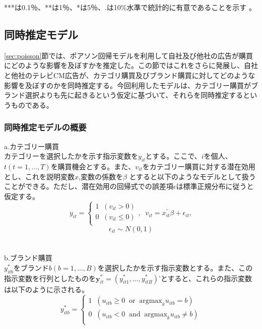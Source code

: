 \documentclass[11pt]{jsarticle}
\begin{document}
***は0.1％、**は1％、*は5％、.は10\%水準で統計的に有意であることを示す 。



\subsection{同時推定モデル}
\label{sec:simultaneous_estimation_model}
\ref{sec:poisson}節では、ポアソン回帰モデルを利用して自社及び他社の広告が購買にどのような影響を及ぼすかを推定した。この節ではこれをさらに発展し、自社と他社のテレビCM広告が、カテゴリ購買及びブランド購買に対してどのような影響を及ぼすのかを同時推定する。今回利用したモデルは、カテゴリー購買がブランド選択よりも先に起きるという仮定に基づいて、それらを同時推定するというものである。

\subsubsection{同時推定モデルの概要}
\label{subsec:simultaneous_summary}
a.カテゴリー購買\\
カテゴリーを選択したかを示す指示変数を$y_{it}$とする。ここで、$i$を個人、$t(t = 1,\ldots,T)$を購買機会とする。また、$v_{it}$をカテゴリー購買に対する潜在効用とし、これを説明変数$x$,変数の係数を$\beta$ とすると以下のようなモデルとして扱うことができる。ただし、潜在効用の回帰式での誤差項$\epsilon$は標準正規分布に従うと仮定する。\\
\begin{equation} \label{formulaa1}
y_{it} = \begin{cases}
             1 \;\; ( v_{it} > 0 )\\
             0 \;\; ( v_{it} \leq 0 )\\
             \end{cases}
             , \;\; v_{it} = x^{\prime}_{it} \beta + \epsilon_{it},
\end{equation}
\begin{equation} \label{formulaa2}
\epsilon_{it} \sim N(0, 1)
\end{equation}\\
\\
b.ブランド購買\\
$y_{itb}^{*}$をブランド$b(b = 1,\ldots,B)$を選択したかを示す指示変数とする。また、この指示変数を行列としたものを$\textbf{y}_{it}^{*} = (y_{it1}^{*},\ldots,y_{itB}^{*})’$とすると、これらの指示変数は以下のように示される。\\
\begin{equation} \label{formulab1}
y^\ast_{itb} = \begin{cases}
             1 \;\; ( u_{itb} \geq 0 \;\; \mbox{or} \;\; \mbox{argmax}_{k}u_{itb} = b)\\
             0 \;\; ( u_{itb} < 0 \;\; \mbox{and} \;\; \mbox{argmax}_{k}u_{itb} \neq b)\\
             \end{cases}
\end{equation}\\
\end{document}
